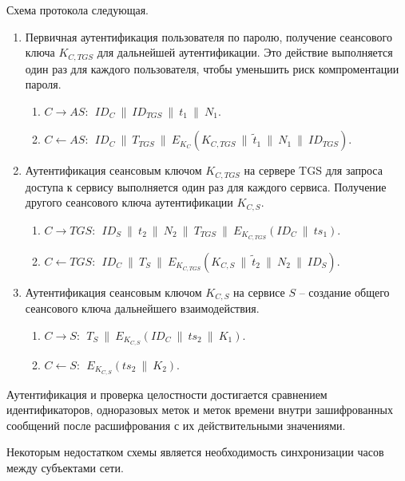 Схема протокола следующая.
\begin{enumerate}
    \item Первичная аутентификация пользователя по паролю, получение сеансового ключа $K_{C,TGS}$ для дальнейшей аутентификации. Это действие выполняется один раз для каждого пользователя, чтобы уменьшить риск компроментации пароля.
        \begin{enumerate}
            \item $C \rightarrow AS: ~~ ID_C ~\|~ ID_{TGS} ~\|~ t_1 ~\|~ N_1$.
            \item $C \leftarrow AS: ~~ ID_C ~\|~ T_{TGS} ~\|~ E_{K_C}( K_{C,TGS} ~\|~ \tilde{t}_1 ~\|~ N_1 ~\|~ ID_{TGS})$.
        \end{enumerate}
    \item Аутентификация сеансовым ключом $K_{C,TGS}$ на сервере TGS для запроса доступа к сервису выполняется один раз для каждого сервиса. Получение другого сеансового ключа аутентификации $K_{C,S}$.
        \begin{enumerate}
            \item $C \rightarrow TGS: ~~ ID_S ~\|~ t_2 ~\|~ N_2 ~\|~ T_{TGS} ~\|~ E_{K_{C,TGS}}(ID_C ~\|~ ts_1)$.
            \item $C \leftarrow TGS: ~~ ID_C ~\|~ T_{S} ~\|~ E_{K_{C,TGS}}( K_{C,S} ~\|~ \tilde{t}_2 ~\|~ N_2 ~\|~ ID_S)$.
        \end{enumerate}
    \item Аутентификация сеансовым ключом $K_{C,S}$ на сервисе $S$ -- создание общего сеансового ключа дальнейшего взаимодействия.
        \begin{enumerate}
            \item $C \rightarrow S: ~~ T_{S} ~\|~ E_{K_{C,S}}(ID_C ~\|~ ts_2 ~\|~ K_1)$.
            \item $C \leftarrow S: ~~ E_{K_{C,S}}( ts_2 ~\|~ K_2)$.
        \end{enumerate}
\end{enumerate}

Аутентификация и проверка целостности достигается сравнением идентификаторов, одноразовых меток и меток времени внутри зашифрованных сообщений после расшифрования с их действительными значениями.

Некоторым недостатком схемы является необходимость синхронизации часов между субъектами сети.
